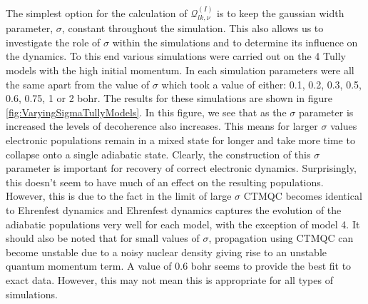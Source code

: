 \noindent The simplest option for the calculation of $\mathcal{Q}_{lk, \nu}^{(I)}$ is to keep the gaussian width parameter, $\sigma$, constant throughout the simulation. This also allows us to investigate the role of $\sigma$ within the simulations and to determine its influence on the dynamics. To this end various simulations were carried out on the 4 Tully models with the high initial momentum. In each simulation parameters were all the same apart from the value of $\sigma$ which took a value of either: 0.1, 0.2, 0.3, 0.5, 0.6, 0.75, 1 or 2 bohr. The results for these simulations are shown in figure \ref{fig:VaryingSigmaTullyModels}. In this figure, we see that as the $\sigma$ parameter is increased the levels of decoherence also increases. This means for larger $\sigma$ values electronic populations remain in a mixed state for longer and take more time to collapse onto a single adiabatic state. Clearly, the construction of this $\sigma$ parameter is important for recovery of correct electronic dynamics. Surprisingly, this doesn't seem to have much of an effect on the resulting populations. However, this is due to the fact in the limit of large $\sigma$ CTMQC becomes identical to Ehrenfest dynamics and Ehrenfest dynamics captures the evolution of the adiabatic populations very well for each model, with the exception of model 4. It should also be noted that for small values of $\sigma$, propagation using CTMQC can become unstable due to a noisy nuclear density giving rise to an unstable quantum momentum term. A value of 0.6 bohr seems to provide the best fit to exact data. However, this may not mean this is appropriate for all types of simulations.

